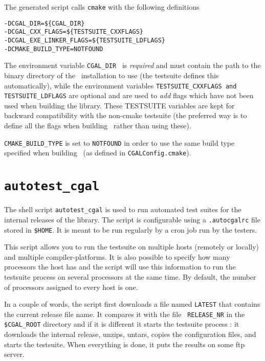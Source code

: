 The generated script calls {\tt cmake} with the following definitions
\begin{verbatim}
-DCGAL_DIR=${CGAL_DIR}
-DCGAL_CXX_FLAGS=${TESTSUITE_CXXFLAGS} 
-DCGAL_EXE_LINKER_FLAGS=${TESTSUITE_LDFLAGS}
-DCMAKE_BUILD_TYPE=NOTFOUND
\end{verbatim}

The environment variable {\tt CGAL\_DIR } is {\em required} and must contain the path
to the binary directory of the \cgal\ installation to use (the testsuite defines 
this automatically), while the environment variables {\tt TESTSUITE\_CXXFLAGS and 
TESTSUITE\_LDFLAGS} are optional and are used to {\em add} flags which have not
been used when building the library. These TESTSUITE variables are
kept for backward compatibility with the non-cmake testsuite (the preferred way is to define all
the flags when building \cgal\ rather than using these).

{\tt CMAKE\_BUILD\_TYPE} is set to {\tt NOTFOUND} in order to use the same
build type specified when building \cgal\ (as defined in {\tt CGALConfig.cmake}).


\section{{\tt autotest\_cgal}}
\label{sec:autotest_cgal}

The shell script {\tt autotest\_cgal} is used to run automated test suites for
the internal releases of the library. The script  is configurable using a
{\tt .autocgalrc} file stored in {\tt \$HOME}.
It is meant to be run regularly by a cron job run by the testers.

This script allows you to run the testsuite on multiple hosts (remotely or
locally) and multiple compiler-platforms. It is also possible to specify how
many processors the host has and the script will use this information to run
the testsuite process on several processors at the same time. By default, the
number of processors assigned to every host is one.

In a couple of words, the script first downloads a file named {\tt LATEST}
that contains the current release file name. It compares it with the file {\tt
RELEASE\_NR} in the {\tt \$CGAL\_ROOT} directory and if it is different it
starts the testsuite process : it downloads the internal release, unzips,
untars, copies the configuration files, and starts the testsuite. When
everything is done, it puts the results on some ftp server.


